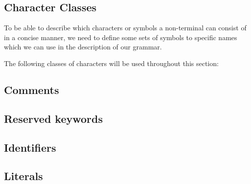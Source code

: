 \subsection{Character Classes}
To be able to describe which characters or symbols a non-terminal can consist of in a concise manner, we need to define some sets of symbols to specific names which we can use in the description of our grammar.

The following classes of characters will be used throughout this section:

\begin{ebnf}
\end{ebnf}

\subsection{Comments}

\subsection{Reserved keywords}

\begin{ebnf}
\end{ebnf}

\subsection{Identifiers}

\begin{ebnf}
\end{ebnf}

\subsection{Literals}

\begin{ebnf}
\end{ebnf}

\begin{ebnf}
\end{ebnf}
